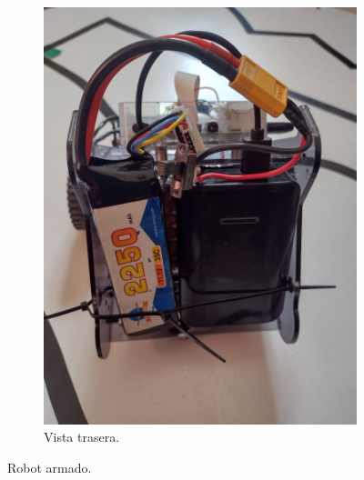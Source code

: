 \documentclass[11pt,a4paper]{article}
\begin{document}
\begin{figure}[h!]
\begin{subfigure}{0.4\textwidth}
			\includegraphics[width=\textwidth]{imagenes/robot_trasero.jpeg}
			\caption{Vista trasera.}
		\end{subfigure}
		\caption{Robot armado.}
		\label{fig:robot}
	\end{figure}
	
\end{document}
